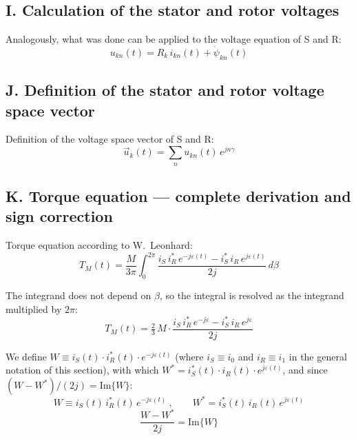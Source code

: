 \documentclass[11pt,a4paper]{article}
\begin{document}
\subsection*{I. Calculation of the stator and rotor voltages}

Analogously, what was done can be applied to the voltage equation of S and R:
\begin{equation}\tag{38}\label{eq:38}
u_{kn}(t) = R_k\, i_{kn}(t) + \dot\psi_{kn}(t)
\end{equation}

\subsection*{J. Definition of the stator and rotor voltage space vector}

Definition of the voltage space vector of S and R:
\begin{equation}\tag{39}\label{eq:39}
\vec u_k(t) = \sum_n u_{kn}(t)\,e^{jn\gamma}
\end{equation}

\subsection*{K. Torque equation --- complete derivation and sign correction}

Torque equation according to W.~Leonhard:
\begin{equation}\tag{40}\label{eq:40}
T_M(t) = \frac{M}{3\pi}\int_0^{2\pi}\frac{i_S\,i_R^{*}\,e^{-j\varepsilon(t)} - i_S^{*}\,i_R\,e^{j\varepsilon(t)}}{2j}\,d\beta
\end{equation}

The integrand does not depend on $\beta$, so the integral is resolved as the integrand multiplied by $2\pi$:
\begin{equation}\tag{41}\label{eq:41}
T_M(t) = \tfrac23\,M\cdot\frac{i_S\,i_R^{*}\,e^{-j\varepsilon} - i_S^{*}\,i_R\,e^{j\varepsilon}}{2j}
\end{equation}

We define $W\equiv i_S(t)\cdot i_R^{*}(t)\cdot e^{-j\varepsilon(t)}$ (where $i_S\equiv i_0$ and $i_R\equiv i_1$ in the general notation of this section), with which $W^{*}=i_S^{*}(t)\cdot i_R(t)\cdot e^{j\varepsilon(t)}$, and since $(W-W^{*})/(2j)=\mathrm{Im}\{W\}$:
\begin{equation}\tag{41a}\label{eq:41a}
W \equiv i_S(t)\,i_R^{*}(t)\,e^{-j\varepsilon(t)}\ ,\qquad W^{*} = i_S^{*}(t)\,i_R(t)\,e^{j\varepsilon(t)}
\end{equation}
\begin{equation}\tag{41b}\label{eq:41b}
\frac{W - W^{*}}{2j} = \mathrm{Im}\{W\}
\end{equation}
\end{document}
